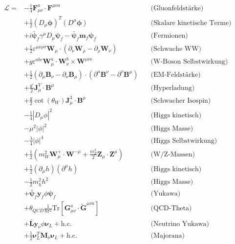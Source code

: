 \documentclass{article}
\begin{document}
	\begin{equation}
		\begin{aligned}
			\mathcal{L} = & -\frac{1}{4} \mathbf{F}_{\mu\nu}^a \cdot \mathbf{F}^{\mu\nu a} \quad &\text{(Gluonfeldstärke)} \\
			& + \frac{1}{2} (D_\mu \boldsymbol{\phi})^T (D^\mu \boldsymbol{\phi}) \quad &\text{(Skalare kinetische Terme)} \\
			& + i \bar{\boldsymbol{\psi}}_f \gamma^\mu D_\mu \boldsymbol{\psi}_f - \bar{\boldsymbol{\psi}}_f \mathbf{m}_f \boldsymbol{\psi}_f \quad &\text{(Fermionen)} \\
			& + \frac{i}{2} \varepsilon^{\mu\nu\rho\sigma} \mathbf{W}_\mu \cdot (\partial_\nu \mathbf{W}_\rho - \partial_\rho \mathbf{W}_\nu) \quad &\text{(Schwache WW)} \\
			& + g \varepsilon^{abc} \mathbf{W}_\mu^a \cdot \mathbf{W}_\nu^b \times \mathbf{W}^{\mu\nu c} \quad &\text{(W-Boson Selbstwirkung)} \\
			& + \frac{1}{2} (\partial_\mu \mathbf{B}_\nu - \partial_\nu \mathbf{B}_\mu) \cdot (\partial^\mu \mathbf{B}^\nu - \partial^\nu \mathbf{B}^\mu) \quad &\text{(EM-Feldstärke)} \\
			& + \frac{g'}{2} \mathbf{J}_\mu^Y \cdot \mathbf{B}^\mu \quad &\text{(Hyperladung)} \\
			& + \frac{g}{2} \cot(\theta_W) \mathbf{J}_\mu^3 \cdot \mathbf{B}^\mu \quad &\text{(Schwacher Isospin)} \\
			& - \frac{1}{4} |D_\mu \phi|^2 \quad &\text{(Higgs kinetisch)} \\
			& - \mu^2 |\phi|^2 \quad &\text{(Higgs Masse)} \\
			& - \frac{\lambda}{4} |\phi|^4 \quad &\text{(Higgs Selbstwirkung)} \\
			& + \frac{1}{2} (m_W^2 \mathbf{W}_\mu^+ \cdot \mathbf{W}^{-\mu} + \frac{m_Z^2}{2} \mathbf{Z}_\mu \cdot \mathbf{Z}^\mu) \quad &\text{(W/Z-Massen)} \\
			& + \frac{1}{2} (\partial_\mu h)(\partial^\mu h) \quad &\text{(Higgs kinetisch)} \\
			& - \frac{1}{2} m_h^2 h^2 \quad &\text{(Higgs Masse)} \\
			& + \bar{\boldsymbol{\psi}}_f \mathbf{y}_f \phi \boldsymbol{\psi}_f \quad &\text{(Yukawa)} \\
			& + \theta_{QCD} \frac{1}{8\pi^2} \text{Tr}[\mathbf{G}_{\mu\nu}^a \cdot \tilde{\mathbf{G}}^{\mu\nu a}] \quad &\text{(QCD-Theta)} \\
			& + \bar{\boldsymbol{L}} \mathbf{y}_\nu \phi \boldsymbol{\nu}_L + \text{h.c.} \quad &\text{(Neutrino Yukawa)} \\
			& + \frac{1}{2} \boldsymbol{\nu}_L^T \mathbf{M}_\nu \boldsymbol{\nu}_L + \text{h.c.} \quad &\text{(Majorana)}
		\end{aligned}
	\end{equation}
	
\end{document}
